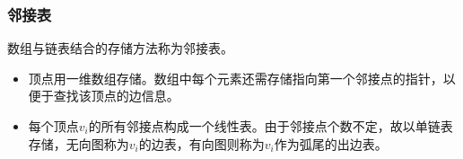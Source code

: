 \subsubsection{邻接表}

\begin{frame}\ft{\subsubsecname}
\begin{figure}
\centering

\end{figure}
\end{frame}


\begin{frame}\ft{\subsecname}
\begin{dingyi}
数组与链表结合的存储方法称为邻接表。
\end{dingyi}


\begin{itemize}
\item
顶点用一维数组存储。数组中每个元素还需存储指向第一个邻接点的指针，以便于查找该顶点的边信息。 \\[0.1in]
\item
每个顶点$v_i$的所有邻接点构成一个线性表。由于邻接点个数不定，故以单链表存储，无向图称为$v_i$的边表，有向图则称为$v_i$作为弧尾的出边表。
\end{itemize}

\end{frame}


\begin{frame}\ft{\subsecname}
\begin{figure}
\centering

\end{figure}

\end{frame}


\begin{frame}\ft{\subsecname}
\begin{figure}
\centering

\end{figure}

\end{frame}


\begin{frame}\ft{\subsecname}
\begin{figure}
\centering

\end{figure}
\end{frame}


\begin{frame}\ft{\subsecname}
  
\end{frame}

